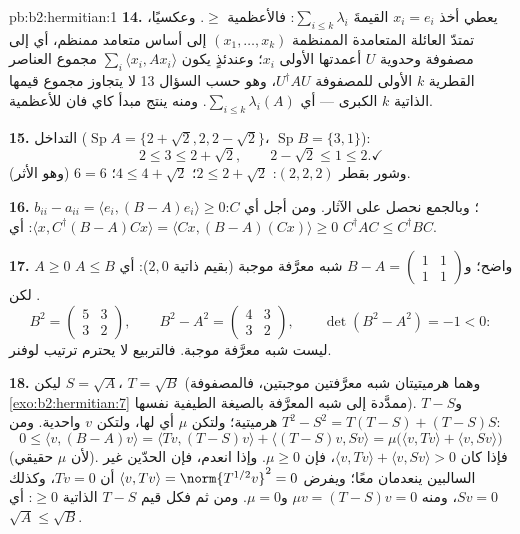 \begin{solution}{pb:b2:hermitian:1}
\textbf{14.} يعطي أخذ $x_i = e_i$ القيمةَ
$\sum_{i\leq k}\lambda_i$: فالأعظمية $\geq$. وعكسيًا، تمتدّ
العائلة المتعامدة الممنظمة $(x_1, \dots, x_k)$ إلى
أساس متعامد ممنظم، أي إلى مصفوفة وحدوية $U$ أعمدتها الأولى
$x_i$؛ وعندئذٍ يكون $\sum_i\langle x_i, Ax_i\rangle$ مجموع
العناصر القطرية $k$ الأولى للمصفوفة $U^\dagger AU$، وهو حسب السؤال
13 لا يتجاوز مجموع قيمها الذاتية $k$ الكبرى ---
أي $\sum_{i\leq k}\lambda_i(A)$. ومنه ينتج مبدأ كاي فان
للأعظمية.

\textbf{15.} التداخل ($\operatorname{Sp}A = \{2+\sqrt2, 2,
2-\sqrt2\}$، $\operatorname{Sp}B = \{3, 1\}$):
\[
2 \leq 3 \leq 2 + \sqrt2,
\qquad
2 - \sqrt2 \leq 1 \leq 2 . \checkmark
\]
وشور بقطر $(2,2,2)$: $2 \leq 2+\sqrt2$؛ $4 \leq 4 +
\sqrt2$؛ $6 = 6$ (وهو الأثر). \checkmark

\textbf{16.} $b_{ii} - a_{ii} = \langle e_i, (B-A)e_i\rangle
\geq 0$؛ وبالجمع نحصل على الآثار. ومن أجل أي $C$: $\langle x,
C^\dagger(B - A)Cx\rangle = \langle Cx, (B-A)(Cx)\rangle \geq
0$: أي $C^\dagger AC \leq C^\dagger BC$.

\textbf{17.} $A \geq 0$ واضح؛ و$B - A = \begin{pmatrix} 1 & 1\\
1 & 1\end{pmatrix}$ شبه معرَّفة موجبة (بقيم ذاتية $2,
0$): أي $A \leq B$. لكن
\[
B^2 = \begin{pmatrix} 5 & 3\\ 3 & 2\end{pmatrix},
\qquad
B^2 - A^2 = \begin{pmatrix} 4 & 3\\ 3 & 2\end{pmatrix},
\qquad \det(B^2 - A^2) = -1 < 0 :
\]
ليست شبه معرَّفة موجبة. فالتربيع لا يحترم
ترتيب لوفنر.

\textbf{18.} ليكن $S = \sqrt A$، $T = \sqrt B$ (وهما هرميتيتان
شبه معرَّفتين موجبتين، فالمصفوفة \cref{exo:b2:hermitian:7} ممدَّدة إلى
شبه المعرَّفة بالصيغة الطيفية نفسها). و$T - S$
هرميتية؛ ولتكن $\mu$ أي  لها، ولتكن $v$  واحدية.
ومن $T^2 - S^2 = T(T - S) + (T - S)S$:
\[
0 \leq \langle v, (B - A)v\rangle
= \langle Tv, (T-S)v\rangle + \langle (T-S)v, Sv\rangle
= \mu\bigl(\langle v, Tv\rangle + \langle v,
Sv\rangle\bigr)
\]
(لأن $\mu$ حقيقي). فإذا كان $\langle v, Tv\rangle + \langle v,
Sv\rangle > 0$، فإن $\mu \geq 0$. وإذا انعدم، فإن الحدّين
غير السالبين ينعدمان معًا؛ ويفرض $\langle v, Tv\rangle =
\norm{T^{1/2}v}^2 = 0$ أن $Tv = 0$، وكذلك $Sv = 0$، ومنه
$\mu v = (T - S)v = 0$ و$\mu = 0$. ومن ثم فكل قيم $T -
S$ الذاتية $\geq 0$: أي $\sqrt A \leq \sqrt B$.


\end{solution}

